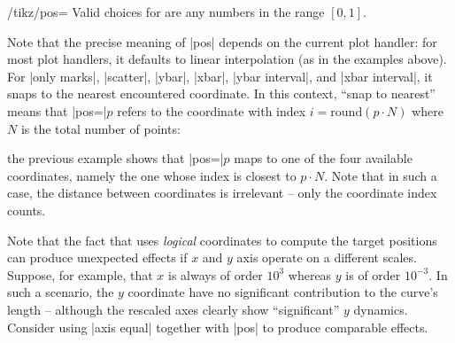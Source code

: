 {\begin{key}{/tikz/pos=}
    Valid choices for  are any numbers in the range $[0,1]$.

    Note that the precise meaning of |pos| depends on the current plot handler:
    for most plot handlers, it defaults to linear interpolation (as in the
    examples above). For |only marks|, |scatter|, |ybar|, |xbar|,
    |ybar interval|, and |xbar interval|, it snaps to the nearest encountered
    coordinate. In this context, ``snap to nearest'' means that |pos=|$p$
    refers to the coordinate with index $i = \text{round}(p \cdot N)$ where $N$
    is the total number of points:
\begin{codeexample}[]
\end{codeexample}
    \noindent the previous example shows that |pos=|$p$ maps to one of the four
    available coordinates, namely the one whose index is closest to $p\cdot N$.
    Note that in such a case, the distance between coordinates is irrelevant --
    only the coordinate index counts.

    Note that the fact that \PGFPlots{} uses \emph{logical} coordinates to
    compute the target positions can produce unexpected effects if $x$ and $y$
    axis operate on a different scales. Suppose, for example, that $x$ is
    always of order $10^3$ whereas $y$ is of order $10^{-3}$. In such a
    scenario, the $y$ coordinate have no significant contribution to the
    curve's length -- although the rescaled axes clearly show ``significant''
    $y$ dynamics. Consider using |axis equal| together with |pos| to produce
    comparable effects.
\end{key}

}
